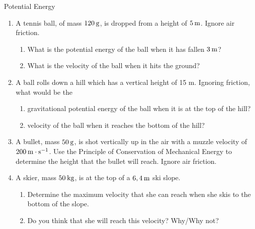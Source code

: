     \noindent
\label{m38786*secfhsst!!!underscore!!!id2545}
\begin{exercises}{Potential Energy }
\nopagebreak \noindent
\begin{enumerate}[noitemsep, label=\textbf{\arabic*}. ] 
\label{m38786*uid95}\item A tennis ball, of mass $120\phantom{\rule{2pt}{0ex}}\text{g}$, is dropped from a height of $5\phantom{\rule{2pt}{0ex}}\text{m}$. Ignore air friction.
\label{m38786*id70639}\begin{enumerate}[noitemsep, label=\textbf{\alph*}. ] 
\label{m38786*uid96}\item What is the potential energy of the ball when it has fallen $3\phantom{\rule{2pt}{0ex}}\text{m}$?
\label{m38786*uid97}\item What is the velocity of the ball when it hits the ground?
\end{enumerate}

\item A ball rolls down a hill which has a vertical height of 15 m. Ignoring friction, what would be the
\begin{enumerate}[noitemsep, label=\textbf{\alph*}. ] 
\item gravitational potential energy of the ball when it is at the top of the hill?
\item velocity of the ball when it reaches the bottom of the hill?
\end{enumerate}

\item A bullet, mass $50\phantom{\rule{2pt}{0ex}}\text{g}$, is shot vertically up in the air with a muzzle velocity of $200\phantom{\rule{2pt}{0ex}}\text{m}\ensuremath{\cdot}\text{s}{}^{-1}$. Use the Principle of Conservation of Mechanical Energy to determine the height that the bullet will reach. Ignore air friction.\newline
\item A skier, mass $50\phantom{\rule{2pt}{0ex}}\text{kg}$, is at the top of a $6,4\phantom{\rule{2pt}{0ex}}\text{m}$ ski slope.
\begin{enumerate}[noitemsep, label=\textbf{\alph*}. ] 
\item Determine the maximum velocity that she can reach when she skis to the bottom of the slope.
\item Do you think that she will reach this velocity? Why/Why not?
\end{enumerate}


\end{enumerate}
\end{exercises}
